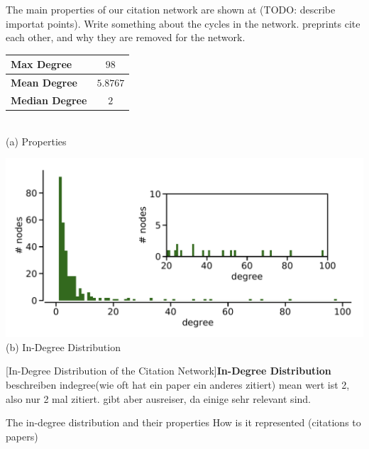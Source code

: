 The main properties of our citation network are shown at (TODO: describe importat points).
Write something about the cycles in the network. preprints cite each other, and why they are removed for the network.
\begin{minipage}[!t]{\textwidth}
  \begin{minipage}[b]{0.39\textwidth}
    \centering
    \begin{tabular}{ l c }
      \toprule
      \textbf{Max Degree}    & $98$     \\ \midrule
      \textbf{Mean Degree}   & $5.8767$ \\ \midrule
      \textbf{Median Degree} & $2$      \\
      \bottomrule
  \end{tabular} \\
  \vspace*{1cm}
  (a) Properties
\end{minipage}
\begin{minipage}[b]{0.59\textwidth}
  \centering
  \includegraphics[width=1.0\textwidth]{figures/in-degree_distribution} \\
  (b) In-Degree Distribution
  \end{minipage}
  [In-Degree Distribution of the Citation Network]{\textbf{In-Degree Distribution} beschreiben indegree(wie oft hat ein paper ein anderes zitiert) mean wert ist 2, also nur 2 mal zitiert. gibt aber ausreiser, da einige sehr relevant sind.}
  \label{fig:indegree_distribution}
\end{minipage}

The in-degree distribution and their properties How is it represented (citations to papers)

